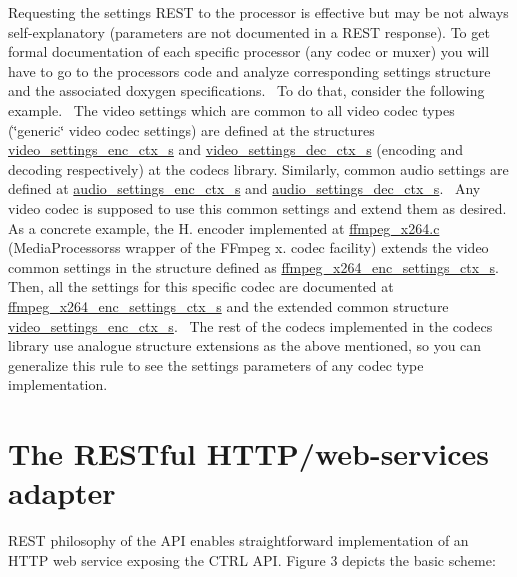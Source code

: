 Requesting the settings R\+E\+ST to the processor is effective but may be not always self-\/explanatory (parameters are not documented in a R\+E\+ST response). To get formal documentation of each specific processor (any codec or muxer) you will have to go to the processor\textquotesingle{}s code and analyze corresponding settings structure and the associated doxygen specifications.~\newline
 To do that, consider the following example.~\newline
 The video settings which are common to all video codec types (\char`\"{}generic\char`\"{} video codec settings) are defined at the structures \hyperlink{structvideo__settings__enc__ctx__s}{video\+\_\+settings\+\_\+enc\+\_\+ctx\+\_\+s} and \hyperlink{structvideo__settings__dec__ctx__s}{video\+\_\+settings\+\_\+dec\+\_\+ctx\+\_\+s} (encoding and decoding respectively) at the \textquotesingle{}codecs\textquotesingle{} library. Similarly, common audio settings are defined at \hyperlink{structaudio__settings__enc__ctx__s}{audio\+\_\+settings\+\_\+enc\+\_\+ctx\+\_\+s} and \hyperlink{structaudio__settings__dec__ctx__s}{audio\+\_\+settings\+\_\+dec\+\_\+ctx\+\_\+s}.~\newline
 Any video codec is supposed to use this common settings and extend them as desired. As a concrete example, the H. encoder implemented at \hyperlink{ffmpeg__x264_8c}{ffmpeg\+\_\+x264.\+c} (Media\+Processors\textquotesingle{}s wrapper of the F\+Fmpeg x. codec facility) extends the video common settings in the structure defined as \hyperlink{structffmpeg__x264__enc__settings__ctx__s}{ffmpeg\+\_\+x264\+\_\+enc\+\_\+settings\+\_\+ctx\+\_\+s}. Then, all the settings for this specific codec are documented at \hyperlink{structffmpeg__x264__enc__settings__ctx__s}{ffmpeg\+\_\+x264\+\_\+enc\+\_\+settings\+\_\+ctx\+\_\+s} and the extended common structure \hyperlink{structvideo__settings__enc__ctx__s}{video\+\_\+settings\+\_\+enc\+\_\+ctx\+\_\+s}.~\newline
 The rest of the codecs implemented in the \textquotesingle{}codecs\textquotesingle{} library use analogue structure extensions as the above mentioned, so you can generalize this rule to see the settings parameters of any codec type implementation.\hypertarget{md_DOCUMENTATION_How_to_use_a_Processor_the_RESTful}{}\section{The R\+E\+S\+Tful H\+T\+T\+P/web-\/services adapter }\label{md_DOCUMENTATION_How_to_use_a_Processor_the_RESTful}
R\+E\+ST philosophy of the A\+PI enables straightforward implementation of an H\+T\+TP web service exposing the C\+T\+RL A\+PI. Figure 3 depicts the basic scheme\+:


